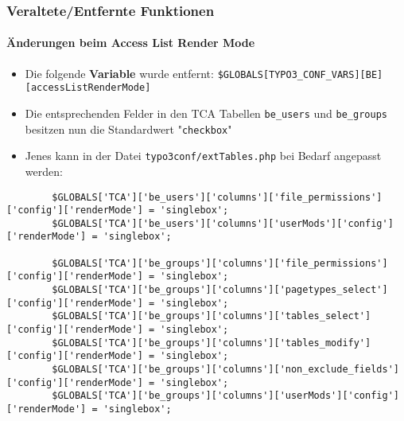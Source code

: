 \begin{frame}[fragile]
	\frametitle{Veraltete/Entfernte Funktionen}
	\framesubtitle{Änderungen beim Access List Render Mode}

	\lstset{basicstyle=\tiny\ttfamily}

	\begin{itemize}

		\item Die folgende \textbf{Variable} wurde entfernt:
			\small\texttt{\$GLOBALS[TYPO3\_CONF\_VARS][BE][accessListRenderMode]}\normalsize

		\item Die entsprechenden Felder in den TCA Tabellen \texttt{be\_users} und \texttt{be\_groups}
			besitzen nun die Standardwert "\texttt{checkbox}"

		\item Jenes kann in der Datei \texttt{typo3conf/extTables.php} bei Bedarf angepasst werden:

	\end{itemize}

	\begin{lstlisting}
		$GLOBALS['TCA']['be_users']['columns']['file_permissions']['config']['renderMode'] = 'singlebox';
		$GLOBALS['TCA']['be_users']['columns']['userMods']['config']['renderMode'] = 'singlebox';

		$GLOBALS['TCA']['be_groups']['columns']['file_permissions']['config']['renderMode'] = 'singlebox';
		$GLOBALS['TCA']['be_groups']['columns']['pagetypes_select']['config']['renderMode'] = 'singlebox';
		$GLOBALS['TCA']['be_groups']['columns']['tables_select']['config']['renderMode'] = 'singlebox';
		$GLOBALS['TCA']['be_groups']['columns']['tables_modify']['config']['renderMode'] = 'singlebox';
		$GLOBALS['TCA']['be_groups']['columns']['non_exclude_fields']['config']['renderMode'] = 'singlebox';
		$GLOBALS['TCA']['be_groups']['columns']['userMods']['config']['renderMode'] = 'singlebox';
	\end{lstlisting}

\end{frame}


